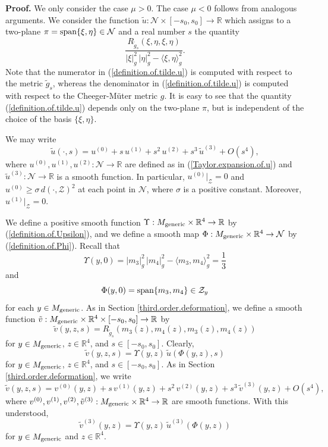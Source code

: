 \documentclass[11pt]{amsart}
\theoremstyle{definition}
\begin{document}
\textbf{Proof.} 
We only consider the case $\mu > 0$. The case $\mu < 0$ follows from analogous arguments. We consider the function $\tilde{u}: \mathcal{N} \times [-s_0,s_0] \to \mathbb{R}$ which assigns to a two-plane $\pi = \text{\rm span}\{\xi,\eta\} \in \mathcal{N}$ and a real number $s$ the quantity 
\begin{equation} 
\label{definition.of.tilde.u}
\frac{R_{\tilde{g}_s}(\xi,\eta,\xi,\eta)}{|\xi|_g^2 \, |\eta|_g^2 - \langle \xi,\eta \rangle_g^2}. 
\end{equation}
Note that the numerator in (\ref{definition.of.tilde.u}) is computed with respect to the metric $\tilde{g}_s$, whereas the denominator in (\ref{definition.of.tilde.u}) is computed with respect to the Cheeger-M\"uter metric $g$. It is easy to see that the quantity (\ref{definition.of.tilde.u}) depends only on the two-plane $\pi$, but is independent of the choice of the basis $\{\xi,\eta\}$. 

We may write 
\[\tilde{u}(\cdot,s) = u^{(0)} + s \, u^{(1)} + s^2 \, u^{(2)} + s^3 \, \tilde{u}^{(3)} + O(s^4),\]
where $u^{(0)},u^{(1)},u^{(2)}: \mathcal{N} \to \mathbb{R}$ are defined as in (\ref{Taylor.expansion.of.u}) and $\tilde{u}^{(3)}: \mathcal{N} \to \mathbb{R}$ is a smooth function. In particular, $u^{(0)}|_{\mathcal{Z}} = 0$ and $u^{(0)} \geq \sigma \, d(\cdot,\mathcal{Z})^2$ at each point in $\mathcal{N}$, where $\sigma$ is a positive constant. Moreover, $u^{(1)}|_{\mathcal{Z}} = 0$.

We define a positive smooth function $\Upsilon: M_{\text{\rm generic}} \times \mathbb{R}^4 \to \mathbb{R}$ by (\ref{definition.of.Upsilon}), and we define a smooth map $\Phi: M_{\text{\rm generic}} \times \mathbb{R}^4 \to \mathcal{N}$ by (\ref{definition.of.Phi}). Recall that 
\[\Upsilon(y,0) = |m_3|_g^2 \, |m_4|_g^2 - \langle m_3,m_4 \rangle_g^2 = \frac{1}{3}\] 
and 
\[\Phi(y,0) = \text{\rm span}\{m_3,m_4\} \in \mathcal{Z}_y\] 
for each $y \in M_{\text{\rm generic}}$. As in Section \ref{third.order.deformation}, we define a smooth function $\tilde{v}: M_{\text{\rm generic}} \times \mathbb{R}^4 \times [-s_0,s_0] \to \mathbb{R}$ by 
\[\tilde{v}(y,z,s) = R_{\tilde{g}_s}(m_3(z),m_4(z),m_3(z),m_4(z))\] 
for $y \in M_{\text{\rm generic}}$, $z \in \mathbb{R}^4$, and $s \in [-s_0,s_0]$. Clearly, 
\[\tilde{v}(y,z,s) = \Upsilon(y,z) \, \tilde{u}(\Phi(y,z),s)\]
for $y \in M_{\text{\rm generic}}$, $z \in \mathbb{R}^4$, and $s \in [-s_0,s_0]$. As in Section \ref{third.order.deformation}, we write 
\[\tilde{v}(y,z,s) = v^{(0)}(y,z) + s \, v^{(1)}(y,z) + s^2 \, v^{(2)}(y,z) + s^3 \, \tilde{v}^{(3)}(y,z) + O(s^4),\] 
where $v^{(0)},v^{(1)},v^{(2)},\tilde{v}^{(3)}: M_{\text{\rm generic}} \times \mathbb{R}^4 \to \mathbb{R}$ are smooth functions. With this understood,  
\[\tilde{v}^{(3)}(y,z) = \Upsilon(y,z) \, \tilde{u}^{(3)}(\Phi(y,z))\] 
for $y \in M_{\text{\rm generic}}$ and $z \in \mathbb{R}^4$.
\end{document}
